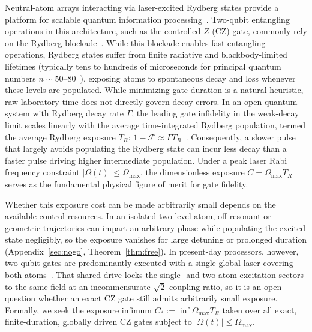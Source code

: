 \documentclass[aps,prx,reprint,nofootinbib,longbibliography,floatfix]{revtex4-2}
\theoremstyle{plain}
\theoremstyle{remark}
\newcommand{\Omax}{\Omega_{\max}}
\newcommand{\TR}{T_{R}}
\begin{document}
Neutral-atom arrays interacting via laser-excited Rydberg states provide a platform for scalable quantum information processing~\cite{Jaksch00,Lukin01,Saffman10,Levine19,Evered23}. Two-qubit entangling operations in this architecture, such as the controlled-$Z$ (CZ) gate, commonly rely on the Rydberg blockade~\cite{Jaksch00,Lukin01,Saffman10}. While this blockade enables fast entangling operations, Rydberg states suffer from finite radiative and blackbody-limited lifetimes (typically tens to hundreds of microseconds for principal quantum numbers $n \sim 50\text{--}80$~\cite{Beterov09,Saffman10}), exposing atoms to spontaneous decay and loss whenever these levels are populated. While minimizing gate duration is a natural heuristic, raw laboratory time does not directly govern decay errors. In an open quantum system with Rydberg decay rate $\Gamma$, the leading gate infidelity in the weak-decay limit scales linearly with the average time-integrated Rydberg population, termed the average Rydberg exposure $\TR$: $1-\mathcal F \approx \Gamma\TR$~\cite{JP22,Locher25,Pagano22,Jandura23}. Consequently, a slower pulse that largely avoids populating the Rydberg state can incur less decay than a faster pulse driving higher intermediate population. Under a peak laser Rabi frequency constraint $|\Omega(t)|\le\Omax$, the dimensionless exposure $C = \Omax \TR$ serves as the fundamental physical figure of merit for gate fidelity.

Whether this exposure cost can be made arbitrarily small depends on the available control resources. In an isolated two-level atom, off-resonant or geometric trajectories can impart an arbitrary phase while populating the excited state negligibly, so the exposure vanishes for large detuning or prolonged duration (Appendix~\ref{sec:nogo}, Theorem~\ref{thm:free}). In present-day processors, however, two-qubit gates are predominantly executed with a single global laser covering both atoms~\cite{Levine19,Evered23}. That shared drive locks the single- and two-atom excitation sectors to the same field at an incommensurate $\sqrt{2}$ coupling ratio, so it is an open question whether an exact CZ gate still admits arbitrarily small exposure. Formally, we seek the exposure infimum $C_* := \inf \Omax \TR$ taken over all exact, finite-duration, globally driven CZ gates subject to $|\Omega(t)|\le\Omax$.
\end{document}
